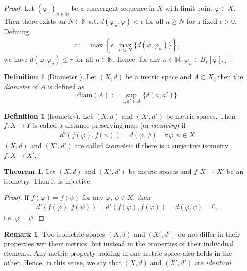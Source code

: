 \documentclass[12pt, a4paper]{article}
\numberwithin{equation}{section}
\theoremstyle{definition}
\theoremstyle{definition}
\newtheorem{defn}[thm]{Definition} %
\newtheorem{remark}[thm]{Remark} %
\newtheorem{theorem}[thm]{Theorem}
\begin{document}
	\begin{proof}
		Let $(\varphi_n)_{n\in\mathbb N}$ be a convergent sequence in $X$ with limit point $\varphi\in X$. Then there exists an $N\in\mathbb N$ s.t. $d(\varphi_n, \varphi) < \epsilon$ for all $n\geq N$ for a fixed $\epsilon > 0$. Defining
		\begin{align}
			r := \max \left\{ \epsilon, \max_{n \leq N}\{d(\varphi, \varphi_n)\} \right\},
		\end{align}
		we have $d(\varphi, \varphi_n) \leq r$ for all $n\in\mathbb N$. Hence, for any $n\in\mathbb N$, 
		$\varphi_n\in B_{r}[\varphi]$.¸
	\end{proof}
	
	\begin{defn}[Diameter \cite{topology-singh}]\label{defn:diameter_metric_set}
		Let $(X, d)$ be a metric space and $A\subset X$, then the \textit{diameter} of $A$ is defined as
		$$\text{diam}(A) := \sup_{a, a'\in A}\{d(a, a')\}$$
	\end{defn}
	
	\begin{defn}[Isometry]
		Let $(X, d)$ and $(X', d')$ be metric spaces. Then $f: X \rightarrow Y$ is called a distance-preserving map (or \textit{isometry}) if
		\begin{align}
			d'(f(\varphi), f(\psi)) = d(\varphi, \psi) \quad\forall \varphi, \psi\in X
		\end{align}
		$(X, d)$ and $(X', d')$ are called \textit{isometric} if there is a surjective isometry $f:X\rightarrow X'$.
	\end{defn}

	\begin{theorem}\label{thrm:isometries_injective}
		Let $(X, d)$ and $(X', d')$ be metric spaces and $f: X\rightarrow X'$  be an isometry. Then it is injective.
	\end{theorem}

	\begin{proof}
		If $f(\varphi) = f(\psi)$ for any $\varphi$, $\psi\in X$, then 
		\begin{align}
			d'(f(\varphi), f(\psi)) = d'(f(\varphi), f(\varphi)) = d(\varphi, \psi) = 0, 
		\end{align}
		i.e. $\varphi = \psi$.
	\end{proof}

	\begin{remark}
		Two isometric spaces $(X, d)$ and $(X', d')$ do not differ in their properties wrt their metrics, but instead in the properties of their individual elements. Any metric property holding in one metric space also holds in the other. Hence, in this sense, we say that $(X, d)$ and $(X', d')$ are \textit{identical}.
	\end{remark}
	
\end{document}
